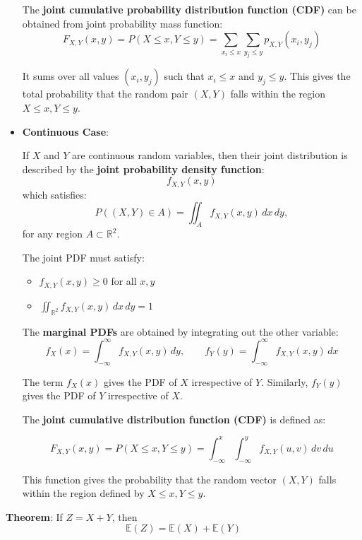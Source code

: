 \documentclass[twoside]{book}
\begin{document}
\begin{itemize}
The \textbf{joint cumulative probability distribution function (CDF)} can be obtained from joint probability mass function:
\[
F_{X,Y}(x, y) = P(X \leq x, Y \leq y) = \sum_{x_i \leq x} \sum_{y_j \leq y} p_{X,Y}(x_i, y_j)
\]

It sums over all values $(x_i,y_j)$ such that $x_i \leq x$ and $y_j \leq y$. This gives the total probability that the random pair \( (X, Y) \) falls within the region \( X \leq x, Y \leq y \).

\item \textbf{Continuous Case}:

If \( X \) and \( Y \) are continuous random variables, then their joint distribution is described by the \textbf{joint probability density function}:
\[
f_{X,Y}(x, y)
\]
which satisfies:
\[
P((X, Y) \in A) = \iint_{A} f_{X,Y}(x, y) \, dx \, dy,
\]
for any region \( A \subset \mathbb{R}^2 \).

The joint PDF must satisfy:
\begin{itemize}
  \item \( f_{X,Y}(x, y) \geq 0 \) for all \( x, y \)
  \item \( \iint_{\mathbb{R}^2} f_{X,Y}(x, y) \, dx \, dy = 1 \)
\end{itemize}

The \textbf{marginal PDFs} are obtained by integrating out the other variable:
\[
f_X(x) = \int_{-\infty}^{\infty} f_{X,Y}(x, y) \, dy, \qquad
f_Y(y) = \int_{-\infty}^{\infty} f_{X,Y}(x, y) \, dx
\]

The term $f_X(x)$ gives the PDF of $X$ irrespective of $Y$. Similarly, $f_Y(y)$ gives the PDF of $Y$ irrespective of $X$.

The \textbf{joint cumulative distribution function (CDF)} is defined as:

\[
F_{X,Y}(x, y) = P(X \leq x, Y \leq y) = \int_{-\infty}^{x} \int_{-\infty}^{y} f_{X,Y}(u, v) \, dv \, du
\]

This function gives the probability that the random vector \( (X, Y) \) falls within the region defined by \( X \leq x, Y \leq y \).
\end{itemize}

\begin{textbox}
\textbf{Theorem}: If \( Z = X + Y \), then
\[
\mathbb{E}(Z) = \mathbb{E}(X) + \mathbb{E}(Y)
\]
\end{textbox}
\end{document}
